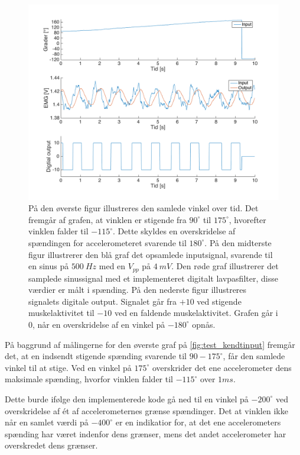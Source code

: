 \begin{figure}[H]
\centering
\includegraphics[width=1\textwidth]{figures/kontrol_test_sinus}
\caption{På den øverste figur illustreres den samlede vinkel over tid. Det fremgår af grafen, at vinklen er stigende fra $90^{\circ}$ til $175^{\circ}$, hvorefter vinklen falder til $-115^{\circ}$. Dette skyldes en overskridelse af spændingen for accelerometeret svarende til $180^{\circ}$.
På den midterste figur illustrerer den blå graf det opsamlede inputsignal, svarende til en sinus på $500~Hz$ med en $V_{pp}$ på $4~mV$. Den røde graf illustrerer det samplede sinussignal med et implementeret digitalt lavpasfilter, disse værdier er målt i spænding. 
På den nederste figur illustreres signalets digitale output. Signalet går fra $+10$ ved stigende muskelaktivitet til $-10$ ved en faldende muskelaktivitet. Grafen går i $0$, når en overskridelse af en vinkel på $-180^{\circ}$ opnås.}
\label{fig:test_kendtinput}
\end{figure}

\noindent
På baggrund af målingerne for den øverste graf på \autoref{fig:test_kendtinput} fremgår det, at en indsendt stigende spænding svarende til $90-175^{\circ}$, får den samlede vinkel til at stige. Ved en vinkel på $175^{\circ}$ overskrider det ene accelerometer dens maksimale spænding, hvorfor vinklen falder til $-115^{\circ}$ over $1ms$. 

Dette burde ifølge den implementerede kode gå ned til en vinkel på $-200^{\circ}$ ved overskridelse af ét af  accelerometernes grænse spændinger. 
Det at vinklen ikke når en samlet værdi på $-400^{\circ}$ er en indikatior for, at det ene accelerometers spænding har været indenfor dens grænser, mens det andet accelerometer har overskredet dens grænser. 

